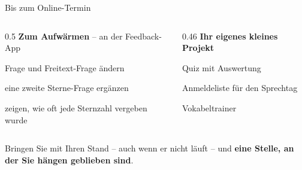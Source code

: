 \begin{frame}{Bis zum Online-Termin}
  \small
  \begin{columns}[onlytextwidth,t]
    \begin{column}{0.5\textwidth}
      \textbf{Zum Aufwärmen} -- an der Feedback-App
      \begin{tugitemize}
        \item Frage und Freitext-Frage ändern
        \item eine zweite Sterne-Frage ergänzen
        \item zeigen, wie oft jede Sternzahl vergeben wurde
      \end{tugitemize}
    \end{column}
    \begin{column}{0.46\textwidth}
      \textbf{Ihr eigenes kleines Projekt}
      \begin{tugitemize}
        \item[\itemArrow] Quiz mit Auswertung
        \item[\itemArrow] Anmeldeliste für den Sprechtag
        \item[\itemArrow] Vokabeltrainer
      \end{tugitemize}
    \end{column}
  \end{columns}
  \vspace{0.4em}
  \begin{block}{Bringen Sie mit}
    \small Ihren Stand -- auch wenn er nicht läuft -- und \textbf{eine Stelle, an der Sie hängen geblieben sind}.
  \end{block}
\end{frame}

